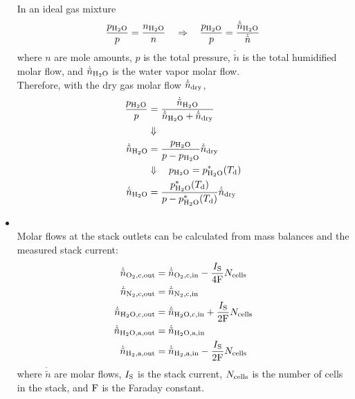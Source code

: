\begin{itemize}
\begin{align}
       \end{align}
% 
       In an ideal gas mixture
        \begin{align}
         \frac{p_{\mathrm{H_2O}}}{p} = \frac{n_{\mathrm{H_2O}}}{n} \quad\Rightarrow\quad \frac{p_{\mathrm{H_2O}}}{p} = \frac{\dot{\tilde n}_{\mathrm{H_2O}}}{\dot{\tilde n}}
        \end{align}
       where $n$ are mole amounts, $p$ is the total pressure, $\dot{\tilde n}$ is the total humidified molar flow, and $\dot{\tilde n}_{\mathrm{H_2O}}$ is the water vapor molar flow.\\
       Therefore, with the dry gas molar flow $\dot{\tilde n}_{\mathrm{dry}}$,
        \begin{align}
         \frac{p_{\mathrm{H_2O}}}{p} &= \frac{\dot{\tilde n}_{\mathrm{H_2O}}}{\dot{\tilde n}_{\mathrm{H_2O}} + \dot{\tilde n}_{\mathrm{dry}}}\\
          &\Downarrow \quad \nonumber\\
         \dot{\tilde n}_{\mathrm{H_2O}} &= \frac{p_{\mathrm{H_2O}}}{p-p_{\mathrm{H_2O}}} \dot{\tilde n}_{\mathrm{dry}} \\
          &\Downarrow \quad p_{\mathrm{H_2O}}=p_{\mathrm{H_2O}}^{\mathrm{\ast}}(T_{\mathrm{d}}) \nonumber\\
         \dot{\tilde n}_{\mathrm{H_2O}} &= \frac{p_{\mathrm{H_2O}}^{\mathrm{\ast}}(T_{\mathrm{d}})}{p-p_{\mathrm{H_2O}}^{\mathrm{\ast}}(T_{\mathrm{d}})} \dot{\tilde n}_{\mathrm{dry}}
        \end{align}
   \item {}\\
       Molar flows at the stack outlets can be calculated from mass balances and the measured stack current:
       \begin{align}
         \dot{\tilde n}_{\mathrm{O_2,c,out}} &= \dot{\tilde n}_{\mathrm{O_2,c,in}}  - \frac{I_{\mathrm{S}}}{4 \mathrm{F}}  N_{\mathrm{cells}} \\
         \dot{\tilde n}_{\mathrm{N_2,c,out}} &= \dot{\tilde n}_{\mathrm{N_2,c,in}} \\
         \dot{\tilde n}_{\mathrm{H_2O,c,out}} &= \dot{\tilde n}_{\mathrm{H_2O,c,in}}  + \frac{I_{\mathrm{S}}}{2 \mathrm{F}}  N_{\mathrm{cells}} \\
         \dot{\tilde n}_{\mathrm{H_2O,a,out}} &= \dot{\tilde n}_{\mathrm{H_2O,a,in}}\\
         \dot{\tilde n}_{\mathrm{H_2,a,out}} &= \dot{\tilde n}_{\mathrm{H_2,a,in}}  - \frac{I_{\mathrm{S}}}{2 \mathrm{F}}  N_{\mathrm{cells}} 
       \end{align}
       where $\dot{\tilde n}$ are molar flows, $I_{\mathrm{S}}$ is the stack current, $N_{\mathrm{cells}}$ is the number of cells in the stack, and $\mathrm{F}$ is the Faraday constant.

\end{itemize}
